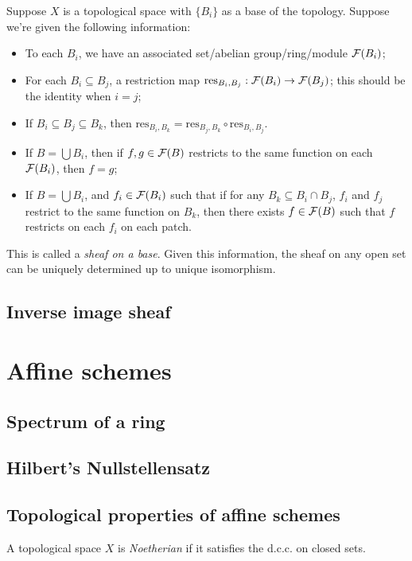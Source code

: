 \documentclass[11pt]{amsart}
\begin{document}
Suppose $X$ is a topological space with $\{B_i\}$ as a base of the topology. Suppose we're given the following information:
\begin{itemize}
    \item To each $B_i$, we have an associated set/abelian group/ring/module $\mathcal{F}(B_i)$;
    \item For each $B_i\subseteq B_j$, a restriction map $\text{res}_{B_i, B_j}: \mathcal{F}(B_i) \to \mathcal{F}(B_j)$; this should be the identity when $i = j$;
    \item If $B_i\subseteq B_j \subseteq B_k$, then $\text{res}_{B_i, B_k} = \text{res}_{B_j, B_k}\circ 
    \text{res}_{B_i, B_j}$.
    \item If $B = \bigcup B_i$, then if $f, g\in \mathcal{F}(B)$ restricts to the same function on each $\mathcal{F}(B_i)$, then $f = g$;
    \item If $B = \bigcup B_i$, and $f_i\in \mathcal{F}(B_i)$ such that if for any $B_k\subseteq B_i\cap B_j$, $f_i$ and $f_j$ restrict to the same function on $B_k$, then there exists $f\in \mathcal{F}(B)$ such that $f$ restricts on each $f_i$ on each patch.
\end{itemize}
This is called a \emph{sheaf on a base}. Given this information, the sheaf on any open set can be uniquely determined up to unique isomorphism.

\subsection{Inverse image sheaf}


\section{Affine schemes}

\subsection{Spectrum of a ring}

\subsection{Hilbert's Nullstellensatz}

\subsection{Topological properties of affine schemes}

\begin{defn}
A topological space $X$ is \emph{Noetherian} if it satisfies the d.c.c. on closed sets.
\end{defn}
\end{document}
